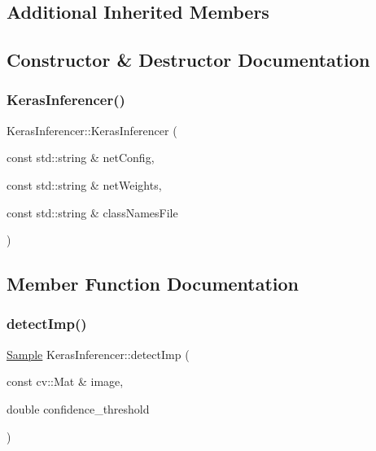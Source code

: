 \subsection*{Additional Inherited Members}


\subsection{Constructor \& Destructor Documentation}
\mbox{\label{class_keras_inferencer_a086ecb2ca8beafba15acdfca0e3ede00}} 
\subsubsection{\texorpdfstring{Keras\+Inferencer()}{KerasInferencer()}}
{\footnotesize\ttfamily Keras\+Inferencer\+::\+Keras\+Inferencer (\begin{DoxyParamCaption}\item[{const std\+::string \&}]{net\+Config,  }\item[{const std\+::string \&}]{net\+Weights,  }\item[{const std\+::string \&}]{class\+Names\+File }\end{DoxyParamCaption})}



\subsection{Member Function Documentation}
\mbox{\label{class_keras_inferencer_a4c944e963e3ec3ca8fa0bd4b229a8931}} 
\subsubsection{\texorpdfstring{detect\+Imp()}{detectImp()}}
{\footnotesize\ttfamily \hyperlink{struct_sample}{Sample} Keras\+Inferencer\+::detect\+Imp (\begin{DoxyParamCaption}\item[{const cv\+::\+Mat \&}]{image,  }\item[{double}]{confidence\+\_\+threshold }\end{DoxyParamCaption})\hspace{0.3cm}{\ttfamily [virtual]}}



